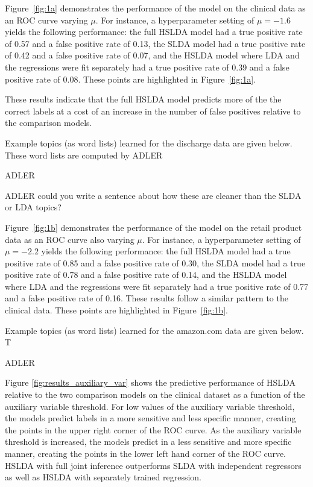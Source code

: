 Figure~\ref{fig:1a} demonstrates the performance of the model on the clinical data as an ROC curve varying $\mu$.  For instance, 
a hyperparameter setting of $\mu=-1.6$ yields the following performance:
the full HSLDA model had a 
true positive rate of 0.57 and a false positive rate of 0.13, the SLDA model
had a true positive rate of 0.42 and a false positive rate of 0.07, and the
HSLDA model where LDA and the regressions were fit separately had a true
positive rate of 0.39 and a false positive rate of 0.08. These points are highlighted in Figure~\ref{fig:1a}.

These results indicate that the full HSLDA model predicts more of the the
correct labels at a cost of an increase in the number of false positives
relative to the comparison models.


Example topics (as word lists) learned for the discharge data are given below.  These word lists are computed by ADLER

\begin{extract}
ADLER
\end{extract}

ADLER could you write a sentence about how these are cleaner than the SLDA or LDA topics?


Figure~\ref{fig:1b} demonstrates the performance of the model on the retail product data as an ROC curve also varying $\mu$. For
instance, a hyperparameter setting of $\mu=-2.2$ yields the following
performance: the full HSLDA model had a true positive rate of 0.85 
and a false positive rate of 0.30, the SLDA model had a true positive
rate of 0.78 and a false positive rate of 0.14, and the HSLDA model where
LDA and the regressions were fit separately had a true positive rate of 0.77
and a false positive rate of 0.16. These results follow a similar pattern to the clinical data. These points are highlighted in Figure~\ref{fig:1b}.

Example topics (as word lists) learned for the amazon.com data are given below.  T

\begin{extract}
ADLER
\end{extract}

Figure \ref{fig:results_auxiliary_var} shows the predictive performance of HSLDA 
relative to the two comparison models on the clinical dataset as a function of the auxiliary variable threshold. 
For low values of the auxiliary variable threshold, the models predict labels
in a more sensitive and less specific manner, creating the points in the upper
right corner of the ROC curve. As the auxiliary variable threshold is
increased, the models predict in a less sensitive and more specific manner,
creating the points in the lower left hand corner of the ROC curve. HSLDA with full joint inference outperforms SLDA with
independent regressors as well as HSLDA with separately trained
regression. 

